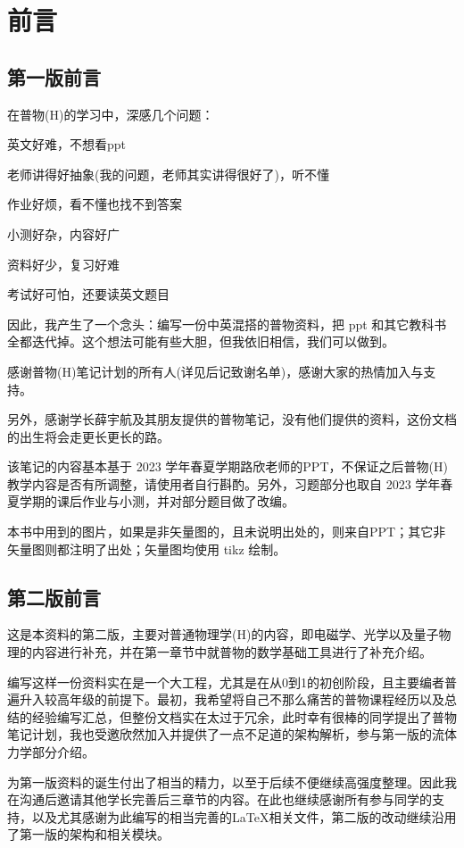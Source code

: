 \chapter{前言}
\section*{第一版前言}
在普物(H)的学习中，深感几个问题：
\begin{Itemize}
    \item 英文好难，不想看ppt
    \item 老师讲得好抽象(我的问题，老师其实讲得很好了)，听不懂
    \item 作业好烦，看不懂也找不到答案
    \item 小测好杂，内容好广
    \item 资料好少，复习好难
    \item 考试好可怕，还要读英文题目
\end{Itemize}

因此，我产生了一个念头：编写一份中英混搭的普物资料，把 ppt 和其它教科书全都迭代掉。这个想法可能有些大胆，但我依旧相信，我们可以做到。

感谢普物(H)笔记计划的所有人(详见后记致谢名单)，感谢大家的热情加入与支持。

另外，感谢学长薛宇航及其朋友提供的普物笔记，没有他们提供的资料，这份文档的出生将会走更长更长的路。

该笔记的内容基本基于 2023 学年春夏学期路欣老师的PPT，不保证之后普物(H)教学内容是否有所调整，请使用者自行斟酌。另外，习题部分也取自 2023 学年春夏学期的课后作业与小测，并对部分题目做了改编。

本书中用到的图片，如果是非矢量图的，且未说明出处的，则来自PPT；其它非矢量图则都注明了出处；矢量图均使用 tikz 绘制。
\newpage
\section*{第二版前言}
这是本资料的第二版，主要对普通物理学(H)的内容，即电磁学、光学以及量子物理的内容进行补充，并在第一章节中就普物的数学基础工具进行了补充介绍。

编写这样一份资料实在是一个大工程，尤其是在从0到1的初创阶段，且主要编者普遍升入较高年级的前提下。最初，我希望将自己不那么痛苦的普物课程经历以及总结的经验编写汇总，但整份文档实在太过于冗余，此时幸有很棒的同学提出了普物笔记计划，我也受邀欣然加入并提供了一点不足道的架构解析，参与第一版的流体力学部分介绍。

\dove 为第一版资料的诞生付出了相当的精力，以至于后续不便继续高强度整理。因此我在沟通后邀请其他学长完善后三章节的内容。在此也继续感谢所有参与同学的支持，以及尤其感谢\dove 为此编写的相当完善的\LaTeX 相关文件，第二版的改动继续沿用了第一版的架构和相关模块。

